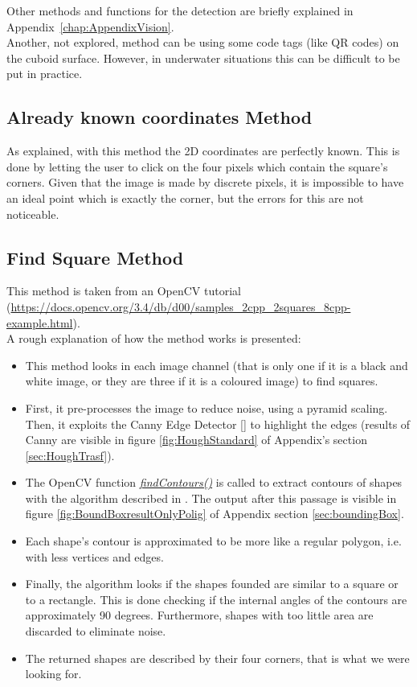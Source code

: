 Other methods and functions for the detection are briefly explained in \mbox{Appendix \ref{chap:AppendixVision}.}\\
Another, not explored, method can be using some code tags (like QR codes) on the cuboid surface. However, in underwater situations this can be difficult to be put in practice.

\subsection{Already known coordinates Method}
\label{subsec:clickMethod}
As explained, with this method the 2D coordinates are perfectly known. This is done by letting the user to click on the four pixels which contain the square's corners. Given that the image is made by discrete pixels, it is impossible to have an ideal point which is exactly the corner, but the errors for this are not noticeable.

\subsection{Find Square Method}
\label{subsec:findSquare}
This method is taken from an OpenCV tutorial (\url{https://docs.opencv.org/3.4/db/d00/samples_2cpp_2squares_8cpp-example.html}).\\
A rough explanation of how the method works is presented:
\begin{itemize}
	\item This method looks in each image channel (that is only one if it is a black and white image, or they are three if it is a coloured image) to find squares.
	\item First, it pre-processes the image to reduce noise, using a pyramid scaling. Then, it exploits the Canny Edge Detector [\cite{CannyEdge}] to highlight the edges (results of Canny are visible in figure \ref{fig:HoughStandard} of Appendix's section \ref{sec:HoughTrasf}).
	\item The OpenCV function \href{https://docs.opencv.org/3.4.6/d3/dc0/group__imgproc__shape.html#ga17ed9f5d79ae97bd4c7cf18403e1689a}{\textit{findContours()}} is called to extract contours of shapes with the algorithm described in \cite{findcountors}. The output after this passage is visible in figure \ref{fig:BoundBoxresultOnlyPolig} of Appendix section \ref{sec:boundingBox}.
	\item Each shape's contour is approximated to be more like a regular polygon, i.e. with less vertices and edges.
	\item Finally, the algorithm looks if the shapes founded are similar to a square or to a rectangle. This is done checking if the internal angles of the contours are approximately 90 degrees. Furthermore, shapes with too little area are discarded to eliminate noise.
	
	\item The returned shapes are described by their four corners, that is what we were looking for.

\end{itemize}


